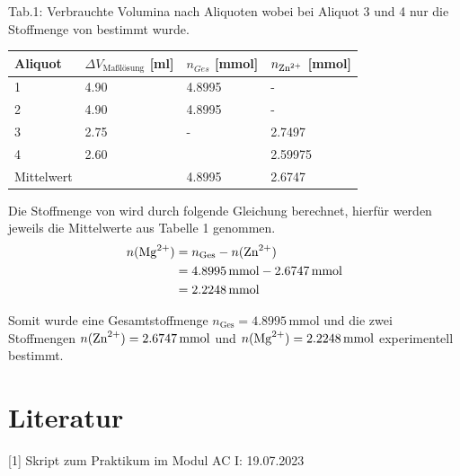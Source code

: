 \documentclass[12pt]{scrartcl} %
\begin{document}
\begin{center}
  Tab.1: Verbrauchte Volumina nach Aliquoten wobei bei Aliquot 3 und 4 nur die Stoffmenge von  bestimmt wurde.\\
\begin{tabular}{l l l l}
  \hline
  Aliquot & $\Delta V_{\text{Maßlösung}}$ [ml] & $n_{Ges}$ [mmol] & $n_{\ce{Zn^{2+}}}$ [mmol]\\
  \hline
  1 & 4.90 & 4.8995 & -\\
  2 & 4.90 & 4.8995 & -\\
  3 & 2.75 & - & 2.7497\\
  4 & 2.60 & & 2.59975 \\
  \hline
  Mittelwert & & 4.8995 & 2.6747\\
\hline
\end{tabular}
\end{center}

Die Stoffmenge von  wird durch folgende Gleichung berechnet, hierfür werden jeweils die Mittelwerte aus Tabelle 1 genommen.
\begin{align*}
  n(\ce{Mg^{2+}}) &= n_{\mathrm{Ges}} - n(\ce{Zn^{2+}})\\
  &= 4.8995\,\mathrm{mmol} - 2.6747\,\mathrm{mmol}\\
  &= 2.2248\,\mathrm{mmol}
\end{align*}

Somit wurde eine Gesamtstoffmenge $n_{\mathrm{Ges}} = 4.8995\,\mathrm{mmol}$ und die zwei Stoffmengen $n(\ce{Zn^{2+}}) = 2.6747\,\mathrm{mmol}$ und $n(\ce{Mg^{2+}}) = 2.2248\,\mathrm{mmol}$ experimentell bestimmt.

\section{Literatur}
[1] Skript zum Praktikum im Modul AC I: 19.07.2023
\end{document}
